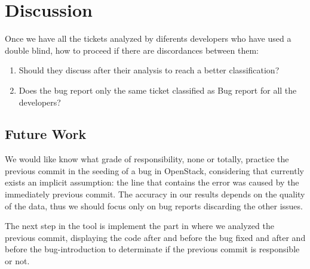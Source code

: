 \documentclass[ifip]{svmult}
\begin{document}

\section{Discussion}
\label{sec:5}

Once we have all the tickets analyzed by diferents developers who have used a double blind, how to proceed if there are discordances between them:
\begin{enumerate}
\item Should they discuss after their analysis to reach a better classification?
\item Does the bug report only the same ticket classified as Bug report for all the developers?
\end{enumerate}

\subsection{Future Work}
\label{sec:5.1}

We would like know what grade of responsibility, none or totally, practice the previous commit in the seeding of a bug in OpenStack, considering that currently exists an implicit assumption: the line that contains the error was caused by the immediately previous commit\cite{Sliwerski}. The accuracy in our results depends on the quality of the data, thus we should focus only on bug reports discarding the other issues.

The next step in the tool is implement the part in where we analyzed the previous commit, displaying the code after and before the bug fixed and after and before the bug-introduction to determinate if the previous commit is responsible or not.





\end{document}
